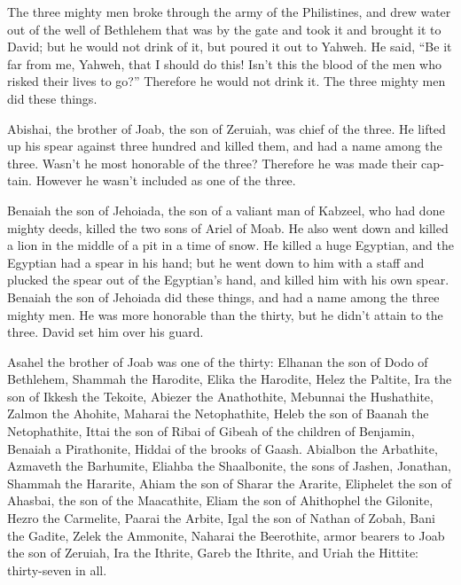 \begin{paracol}{2}
\begin{otherlanguage}{english}
 The three mighty men broke through the army of the
Philistines, and drew water out of the well of Bethlehem that was by the
gate and took it and brought it to David; but he would not drink of it,
but poured it out to Yahweh.  He said, ``Be it far from
me, Yahweh, that I should do this! Isn't this the blood of the men who
risked their lives to go?'' Therefore he would not drink it. The three
mighty men did these things.

 Abishai, the brother of Joab, the son of Zeruiah, was
chief of the three. He lifted up his spear against three hundred and
killed them, and had a name among the three.  Wasn't he
most honorable of the three? Therefore he was made their captain.
However he wasn't included as one of the three.

 Benaiah the son of Jehoiada, the son of a valiant man of
Kabzeel, who had done mighty deeds, killed the two sons of Ariel of
Moab. He also went down and killed a lion in the middle of a pit in a
time of snow.  He killed a huge Egyptian, and the
Egyptian had a spear in his hand; but he went down to him with a staff
and plucked the spear out of the Egyptian's hand, and killed him with
his own spear.  Benaiah the son of Jehoiada did these
things, and had a name among the three mighty men.  He
was more honorable than the thirty, but he didn't attain to the three.
David set him over his guard.

 Asahel the brother of Joab was one of the thirty:
Elhanan the son of Dodo of Bethlehem,  Shammah the
Harodite, Elika the Harodite,  Helez the Paltite, Ira the
son of Ikkesh the Tekoite,  Abiezer the Anathothite,
Mebunnai the Hushathite,  Zalmon the Ahohite, Maharai the
Netophathite,  Heleb the son of Baanah the Netophathite,
Ittai the son of Ribai of Gibeah of the children of Benjamin,
 Benaiah a Pirathonite, Hiddai of the brooks of Gaash.
 Abialbon the Arbathite, Azmaveth the Barhumite,
 Eliahba the Shaalbonite, the sons of Jashen, Jonathan,
 Shammah the Hararite, Ahiam the son of Sharar the
Ararite,  Eliphelet the son of Ahasbai, the son of the
Maacathite, Eliam the son of Ahithophel the Gilonite, 
Hezro the Carmelite, Paarai the Arbite,  Igal the son of
Nathan of Zobah, Bani the Gadite,  Zelek the Ammonite,
Naharai the Beerothite, armor bearers to Joab the son of Zeruiah,
 Ira the Ithrite, Gareb the Ithrite,  and
Uriah the Hittite: thirty-seven in all.


\end{otherlanguage}
\end{paracol}
